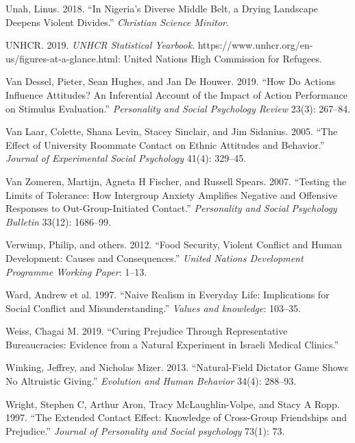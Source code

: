 \documentclass[11pt]{article}
\begin{document}
\leavevmode\hypertarget{ref-unah2018nigeria}{}%
Unah, Linus. 2018. ``In Nigeria's Diverse Middle Belt, a Drying
Landscape Deepens Violent Divides.'' \emph{Christian Science Minitor}.

\leavevmode\hypertarget{ref-unhcr2019}{}%
UNHCR. 2019. \emph{UNHCR Statistical Yearbook}.
https://www.unhcr.org/en-us/figures-at-a-glance.html: United Nations
High Commission for Refugees.

\leavevmode\hypertarget{ref-van2019actions}{}%
Van Dessel, Pieter, Sean Hughes, and Jan De Houwer. 2019. ``How Do
Actions Influence Attitudes? An Inferential Account of the Impact of
Action Performance on Stimulus Evaluation.'' \emph{Personality and
Social Psychology Review} 23(3): 267--84.

\leavevmode\hypertarget{ref-van2005effect}{}%
Van Laar, Colette, Shana Levin, Stacey Sinclair, and Jim Sidanius. 2005.
``The Effect of University Roommate Contact on Ethnic Attitudes and
Behavior.'' \emph{Journal of Experimental Social Psychology} 41(4):
329--45.

\leavevmode\hypertarget{ref-van2007testing}{}%
Van Zomeren, Martijn, Agneta H Fischer, and Russell Spears. 2007.
``Testing the Limits of Tolerance: How Intergroup Anxiety Amplifies
Negative and Offensive Responses to Out-Group-Initiated Contact.''
\emph{Personality and Social Psychology Bulletin} 33(12): 1686--99.

\leavevmode\hypertarget{ref-verwimp2012food}{}%
Verwimp, Philip, and others. 2012. ``Food Security, Violent Conflict and
Human Development: Causes and Consequences.'' \emph{United Nations
Development Programme Working Paper}: 1--13.

\leavevmode\hypertarget{ref-ward1997naive}{}%
Ward, Andrew et al. 1997. ``Naive Realism in Everyday Life: Implications
for Social Conflict and Misunderstanding.'' \emph{Values and knowledge}:
103--35.

\leavevmode\hypertarget{ref-weiss2019curing}{}%
Weiss, Chagai M. 2019. ``Curing Prejudice Through Representative
Bureaucracies: Evidence from a Natural Experiment in Israeli Medical
Clinics.''

\leavevmode\hypertarget{ref-winking2013natural}{}%
Winking, Jeffrey, and Nicholas Mizer. 2013. ``Natural-Field Dictator
Game Shows No Altruistic Giving.'' \emph{Evolution and Human Behavior}
34(4): 288--93.

\leavevmode\hypertarget{ref-wright1997extended}{}%
Wright, Stephen C, Arthur Aron, Tracy McLaughlin-Volpe, and Stacy A
Ropp. 1997. ``The Extended Contact Effect: Knowledge of Cross-Group
Friendships and Prejudice.'' \emph{Journal of Personality and Social
psychology} 73(1): 73.
\end{document}
